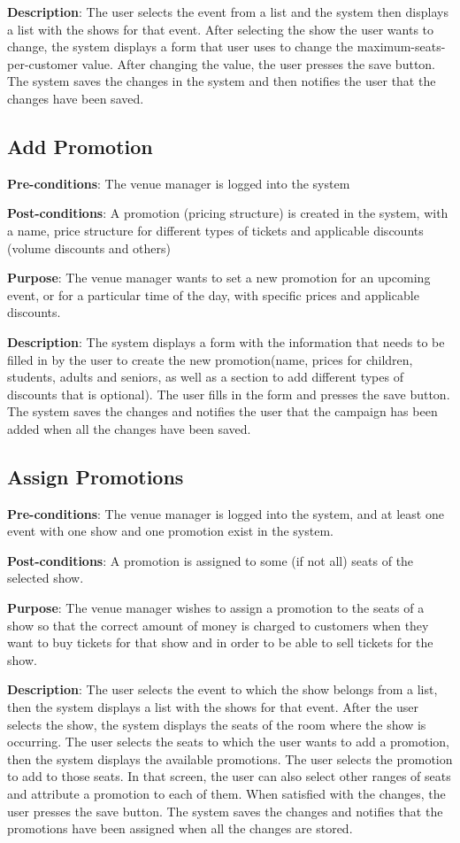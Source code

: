 \textbf{Description}: The user selects the event from a list and the system then displays a list with the shows for that event. After selecting the show the user wants to change, the system displays a form that user uses to change the maximum-seats-per-customer value. After changing the value, the user presses the save button. The system saves the changes in the system and then notifies the user that the changes have been saved.

\subsection{Add Promotion}
\textbf{Pre-conditions}: The venue manager is logged into the system

\textbf{Post-conditions}: A promotion (pricing structure) is created in the system, with a name, price structure for different types of tickets and applicable discounts (volume discounts and others)

\textbf{Purpose}: The venue manager wants to set a new promotion for an upcoming event, or for a particular time of the day, with specific prices and applicable discounts.

\textbf{Description}: The system displays a form with the information that needs to be filled in by the user to create the new promotion(name, prices for children, students, adults and seniors, as well as a section to add different types of discounts that is optional). The user fills in the form and presses the save button. The system saves the changes and notifies the user that the campaign has been added when all the changes have been saved.

\subsection{Assign Promotions}
\textbf{Pre-conditions}: The venue manager is logged into the system, and at least one event with one show and one promotion exist in the system.

\textbf{Post-conditions}: A promotion is assigned to some (if not all) seats of the selected show.

\textbf{Purpose}: The venue manager wishes to assign a promotion to the seats of a show so that the correct amount of money is charged to customers when they want to buy tickets for that show and in order to be able to sell tickets for the show.

\textbf{Description}: The user selects the event to which the show belongs from a list, then the system displays a list with the shows for that event. After the user selects the show, the system displays the seats of the room where the show is occurring. The user selects the seats to which the user wants to add a promotion, then the system displays the available promotions. The user selects the promotion to add to those seats. In that screen, the user can also select other ranges of seats and attribute a promotion to each of them. When satisfied with the changes, the user presses the save button. The system saves the changes and notifies that the promotions have been assigned when all the changes are stored.

